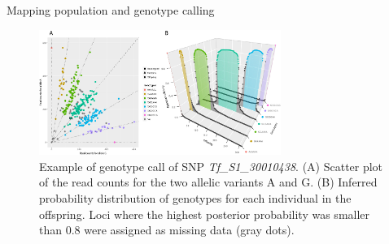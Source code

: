 \documentclass[final, 13pt]{beamer}
\newlength{\twocolwid}
\begin{document}
\begin{frame}[t]
\begin{columns}[t]
\begin{column}{\twocolwid}
\begin{block}{Mapping population and genotype calling}
    \begin{figure}[htp]\label{fig:info}
      \centering
      \includegraphics[width=0.7\textwidth]{figures/Tf_S1_30010438.jpg}
      \caption{\hspace{.01cm} Example of genotype call of SNP \textit{Tf\_S1\_30010438}. (A) Scatter plot of the read counts for the two allelic variants A and G. (B) Inferred probability distribution of genotypes for each individual in the offspring. Loci where the highest posterior probability was smaller than 0.8 were assigned as missing data (gray dots).}
    \end{figure}
  \end{block}


\end{column}
\end{columns}
\end{frame}
\end{document}
